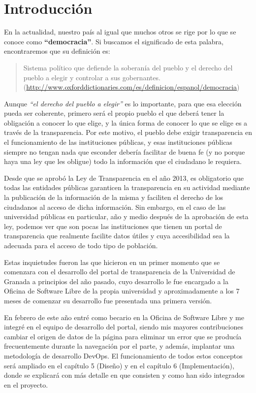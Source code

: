 \chapter{Introducción}

En la actualidad, nuestro país al igual que muchos otros se rige por lo que se conoce como \textbf{``democracia''}. Si buscamos
el significado de esta palabra, encontraremos que su definición es: 

\begin{quote}Sistema político que defiende la soberanía del pueblo y el derecho del pueblo a elegir y controlar a sus gobernantes.
\newline(\url{http://www.oxforddictionaries.com/es/definicion/espanol/democracia})
\end{quote}

Aunque \textit{``el derecho del pueblo a elegir''} es lo importante, para que esa elección pueda ser coherente, primero será el propio pueblo el que deberá tener la obligación a conocer lo que elige, y la única forma de conocer lo que se elige es a través de la transparencia. Por este motivo, el pueblo debe exigir transparencia en el funcionamiento de las instituciones públicas, y esas instituciones públicas siempre no tengan nada que esconder debería facilitar de buena fe (y no porque haya una ley que les obligue) todo la información que el ciudadano le requiera.

\bigskip
Desde que se aprobó la Ley de Transparencia en el año 2013, es obligatorio que todas las entidades públicas garanticen la transparencia en su actividad mediante la publicación de la información de la misma y faciliten el derecho de los ciudadanos al acceso de dicha información. Sin embargo, en el caso de las universidad públicas en particular, año y medio después de la aprobación de esta ley, podemos ver que son pocas las instituciones que tienen un portal de transparencia que realmente facilite datos útiles y cuya accesibilidad sea la adecuada para el acceso de todo tipo de población.

\bigskip
Estas inquietudes fueron las que hicieron en un primer momento que se comenzara con el desarrollo del portal de transparencia de la Universidad de Granada a principios del año pasado, cuyo desarrollo le fue encargado a la Oficina de Software Libre de la propia universidad y aproximadamente a los 7 meses de comenzar su desarrollo fue presentada una primera versión.

\bigskip
En febrero de este año entré como becario en la Oficina de Software Libre y me integré en el equipo de desarrollo del portal, siendo mis mayores contribuciones cambiar el origen de datos de la página para eliminar un error que se producía frecuentemente durante la navegación por el parte, y además, implantar una metodología de desarrollo DevOps. El funcionamiento de todos estos conceptos será ampliado en el capítulo 5 (Diseño) y en el capítulo 6 (Implementación), donde se explicará con más detalle en que consisten y como han sido integrados en el proyecto.

